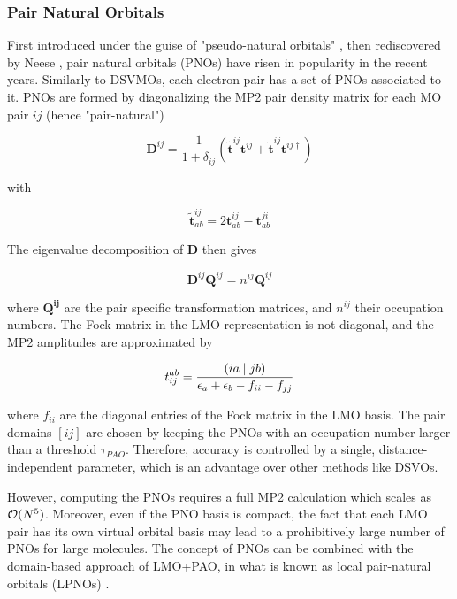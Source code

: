\subsubsection*{Pair Natural Orbitals}
First introduced under the guise of "pseudo-natural orbitals" \cite{Edm1965}, then rediscovered by Neese \cite{Nee2009a,Nee2009b,Han2011}, pair natural orbitals (PNOs) have risen in popularity in the recent years. Similarly to DSVMOs, each electron pair has a set of PNOs associated to it. PNOs are formed by diagonalizing the MP2 pair density matrix for each MO pair $ij$ (hence "pair-natural")

\begin{equation}
\mathbf{D}^{ij} = \frac{1}{1+\delta_{ij}} \left(\tilde{\mathbf{t}}^{ij} \mathbf{t}^{ij} + \tilde{\mathbf{t}}^{ij} \mathbf{t}^{ij\dagger} \right)
\end{equation}

\noindent with 

\begin{equation}
\mathbf{\tilde{t}}^{ij}_{ab} = 2 \mathbf{t}^{ij}_{ab} - \mathbf{t}^{ji}_{ab} 
\end{equation}

\noindent The eigenvalue decomposition of $\mathbf{D}$ then gives

\begin{equation}
\mathbf{D}^{ij} \mathbf{Q}^{ij} = n^{ij} \mathbf{Q}^{ij} 
\end{equation}

\noindent where $\mathbf{Q^{ij}}$ are the pair specific transformation matrices, and $n^{ij}$ their occupation numbers. The Fock matrix in the LMO representation is not diagonal, and the MP2 amplitudes are approximated by

\begin{equation}
t_{ij}^{ab} = \frac{\left( ia \mid jb \right)}{\epsilon_a + \epsilon_b - f_{ii} - f_{jj}}
\end{equation}

\noindent where $f_{ii}$ are the diagonal entries of the Fock matrix in the LMO basis. The pair domains $[ij]$ are chosen by keeping the PNOs with an occupation number larger than a threshold $\tau_{PAO}$. Therefore, accuracy is controlled by a single, distance-independent parameter, which is an advantage over other methods like DSVOs. 

However, computing the PNOs requires a full MP2 calculation which scales as $\mathcal{O}(N^{5})$. Moreover, even if the PNO basis is compact, the fact that each LMO pair has its own virtual orbital basis may lead to a prohibitively large number of PNOs for large molecules. The concept of PNOs can be combined with the domain-based approach of LMO+PAO, in what is known as local pair-natural orbitals (LPNOs) \cite{Rip2013}. 

